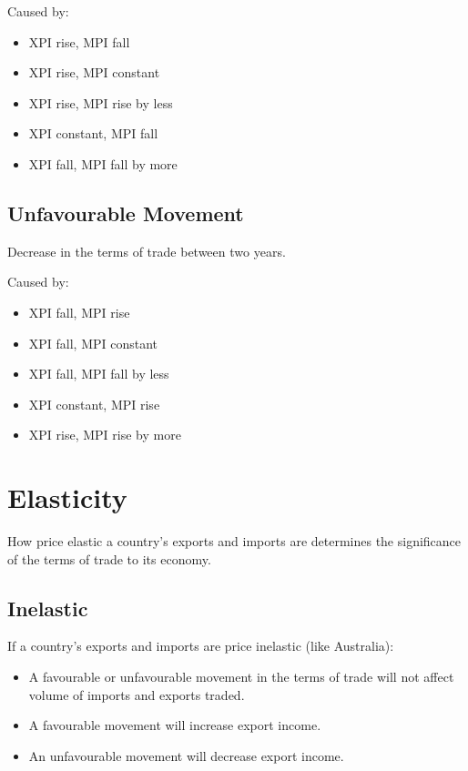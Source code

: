 \documentclass[a4paper,11pt]{article}
\begin{document}
Caused by:

\begin{itemize}
\item XPI rise, MPI fall
\item XPI rise, MPI constant
\item XPI rise, MPI rise by less
\item XPI constant, MPI fall
\item XPI fall, MPI fall by more
\end{itemize}


\subsection{Unfavourable Movement}

Decrease in the terms of trade between two years.

Caused by:

\begin{itemize}
\item XPI fall, MPI rise
\item XPI fall, MPI constant
\item XPI fall, MPI fall by less
\item XPI constant, MPI rise
\item XPI rise, MPI rise by more
\end{itemize}




\section{Elasticity}

How price elastic a country's exports and imports are determines the
significance of the terms of trade to its economy.


\subsection{Inelastic}

If a country's exports and imports are price inelastic (like Australia):

\begin{itemize}
\item A favourable or unfavourable movement in the terms of trade will not
	affect volume of imports and exports traded.
\item A favourable movement will increase export income.
\item An unfavourable movement will decrease export income.
\end{itemize}
\end{document}
